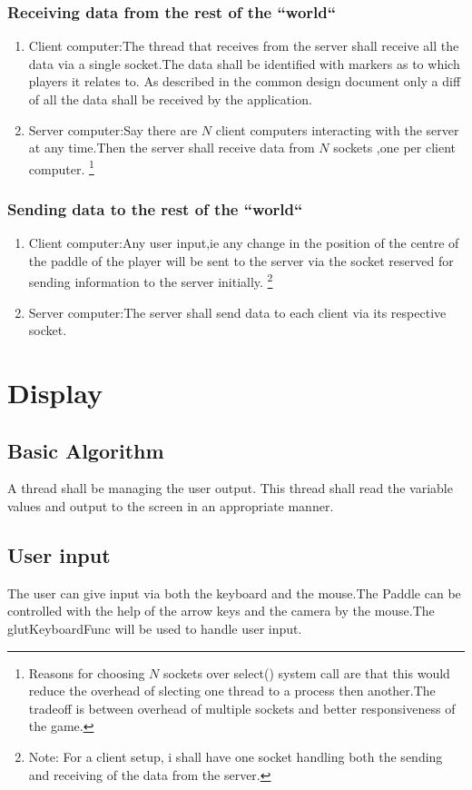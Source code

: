 \documentclass[11pt]{article}
\begin{document}
\subsubsection{Receiving data from the rest of the ``world``}
\begin{enumerate}
\item Client computer:The thread that receives from the server shall receive all the data via a single socket.The data shall be identified with markers as to which players it relates to. As described in the common design document only a diff of all the data shall be received by the application.
\item Server computer:Say there are $N$ client computers interacting with the server at any time.Then the server shall receive data from $N$ sockets ,one per client computer.
\footnote{Reasons for choosing $N$ sockets over select() system call are that this would reduce the overhead of slecting one thread to a process then another.The tradeoff is between overhead of multiple sockets and better responsiveness of the game.}
\end{enumerate}
\subsubsection{Sending data to the rest of the ``world``}
\begin{enumerate}
\item Client computer:Any user input,ie any change in the position of the centre of the paddle of the player will be sent to the server via the socket reserved for sending information to the server initially.
\footnote{Note: For a client setup, i shall have one socket handling both the sending and receiving of the data from the server.}
\item Server computer:The server shall send data to each client via its respective socket.
\pagebreak
\end{enumerate}

\section{Display}
\subsection{Basic Algorithm}
A thread shall be managing the user output. This thread shall read the variable values and output to the screen in an appropriate manner.
\subsection{User input}
The user can give input via both the keyboard and the mouse.The Paddle can be controlled with the help of the arrow keys and the camera by the mouse.The glutKeyboardFunc will be used to handle user input.
\end{document}
